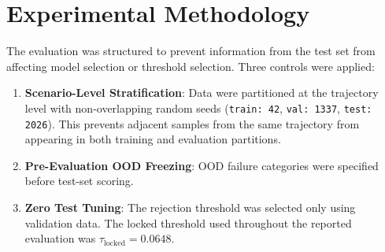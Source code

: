 \documentclass[conference]{IEEEtran}
\begin{document}
\section{Experimental Methodology}

The evaluation was structured to prevent information from the test set from affecting model selection or threshold selection. Three controls were applied:
\begin{enumerate}
    \item \textbf{Scenario-Level Stratification}: Data were partitioned at the trajectory level with non-overlapping random seeds (\texttt{train: 42}, \texttt{val: 1337}, \texttt{test: 2026}). This prevents adjacent samples from the same trajectory from appearing in both training and evaluation partitions.
    \item \textbf{Pre-Evaluation OOD Freezing}: OOD failure categories were specified before test-set scoring.
    \item \textbf{Zero Test Tuning}: The rejection threshold was selected only using validation data. The locked threshold used throughout the reported evaluation was $\tau_{\mathrm{locked}}=0.0648$.
\end{enumerate}

\begin{table}[htbp]
\centering
\caption{Telemetry Datasets: Characterization and Summary Statistics}
\label{tab:datasets}
\end{table}
\end{document}
